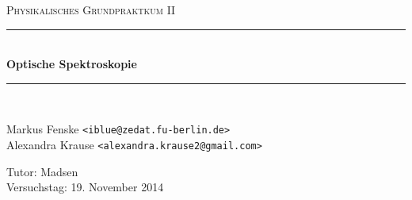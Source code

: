 \newcommand{\HRule}{\rule{\linewidth}{0.5mm}}

\begin{center}
  \textsc{\Large Physikalisches Grundpraktkum II}
  \HRule\\[0.4 cm]
  {\huge \bfseries Optische Spektroskopie}
  \HRule\\[0.4 cm]

  \begin{minipage}{0.60\textwidth}
  \begin{flushleft}
    Markus Fenske \texttt{<iblue@zedat.fu-berlin.de>} \\
    Alexandra Krause \texttt{<alexandra.krause2@gmail.com>}
  \end{flushleft}
  \end{minipage}
  \hfill
  \begin{minipage}{0.35\textwidth}
  \begin{flushright}
    Tutor: Madsen \\
    Versuchstag: 19. November 2014
  \end{flushright}
  \end{minipage}

  \vspace{1cm}

  \tableofcontents


  \vfill
\end{center}
\newpage
